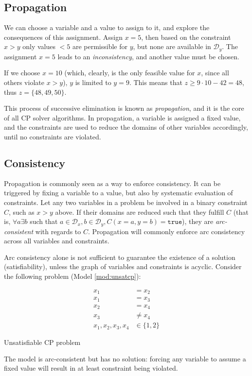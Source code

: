 \documentclass[13pt, letterpaper, oneside]{book}
\begin{document}
\subsection{Propagation}
We can choose a variable and a value to assign to it, and explore the
consequences of this assignment. Assign $x = 5$, then based on the constraint $x
> y$ only values $< 5$ are permissible for $y$, but none are available in
$\mathcal{D}_y$. The assignment $x = 5$ leads to an \textit{inconsistency}, and
another value must be chosen.
 
If we choose $x = 10$ (which, clearly, is the only feasible value for $x$, since all
others violate $x > y$), $y$ is limited to $y = 9$. This means that $z \geq 9 \cdot
10 - 42 = 48$, thus $z = \{48, 49, 50\}$.
 
This process of successive elimination is known as
\textit{propagation}, and it is the core of all CP solver algorithms. In
propagation, a variable is assigned a fixed value, and the constraints are used
to reduce the domains of other variables accordingly, until no constraints are
violated.

\subsection{Consistency}
Propagation is commonly seen as a way to enforce consistency. It can be
triggered by fixing a variable to a value, but also by systematic evaluation of
constraints. Let any two variables in a problem be involved in a binary
constraint $C$, such as $x > y$ above. If their domains are reduced such that
they fulfill $C$ (that is, $\forall a \exists b$ such that $a \in
\mathcal{D}_x, b \in \mathcal{D}_y, C(x = a, y = b) = \mathtt{true}$), they are
\textit{arc-consistent} with regards to $C$. Propagation will commonly enforce
arc consistency across all variables and constraints.
 
Arc consistency alone is not sufficient to guarantee the existence of a solution
(satisfiability), unless the graph of variables and constraints is acyclic.
Consider the following problem (Model \ref{mod:unsatcp}):
 
\begin{model}[h!]
\begin{align}
x_1 &= x_2\\
x_1 &= x_3\\
x_2 &= x_4\\
x_3 &\neq x_4\\
x_1, x_2, x_3, x_4 &\in \{1, 2\}
\end{align}
\caption{Unsatisfiable CP problem}
\label{mod:unsatcp}
\end{model}
The model is arc-consistent but has no solution: forcing any variable to assume
a fixed value will result in at least constraint being violated.
 
\end{document}
